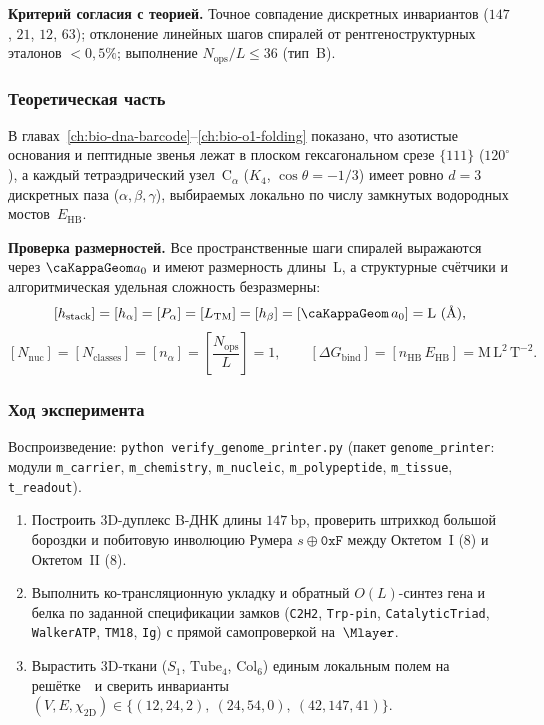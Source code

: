 \textbf{Критерий согласия с теорией.}
Точное совпадение дискретных инвариантов ($147$, $21$, $12$, $63$); отклонение линейных шагов спиралей от рентгеноструктурных эталонов $<0{,}5\%$; выполнение $N_{\mathrm{ops}}/L \le 36$ (тип~B).

\subsubsection*{Теоретическая часть}
В главах~\ref{ch:bio-dna-barcode}--\ref{ch:bio-o1-folding} показано, что азотистые основания и пептидные звенья лежат в плоском гексагональном срезе $\{111\}$ ($120^\circ$), а каждый тетраэдрический узел~$\text{C}_\alpha$ ($K_4$, $\cos\theta=-1/3$) имеет ровно $d=3$ дискретных паза ($\alpha,\beta,\gamma$), выбираемых локально по числу замкнутых водородных мостов~$E_{\mathrm{HB}}$.

\textbf{Проверка размерностей.}
Все пространственные шаги спиралей выражаются через $\caKappaGeom a_0$ и имеют размерность длины~$\mathrm{L}$, а структурные счётчики и алгоритмическая удельная сложность безразмерны:
\[
  [h_{\mathrm{stack}}] = [h_\alpha] = [P_\alpha] = [L_{\mathrm{TM}}] = [h_\beta] = [\caKappaGeom\,a_0] = \mathrm{L}\ (\text{\normalfont\AA}),
\]
\[
  [N_{\mathrm{nuc}}] = [N_{\mathrm{classes}}] = [n_\alpha] = \left[\frac{N_{\mathrm{ops}}}{L}\right] = 1,\qquad
  [\Delta G_{\mathrm{bind}}] = [n_{\mathrm{HB}}\,E_{\mathrm{HB}}] = \mathrm{M\,L^2\,T^{-2}}.
\]

\subsubsection*{Ход эксперимента}
Воспроизведение: \texttt{python verify\_genome\_printer.py} (пакет \texttt{genome\_printer}: модули \texttt{m\_carrier}, \texttt{m\_chemistry}, \texttt{m\_nucleic}, \texttt{m\_polypeptide}, \texttt{m\_tissue}, \texttt{t\_readout}).

\begin{enumerate}[label=\textbf{Шаг \arabic*:},leftmargin=*,itemsep=0.35em]
\item Построить 3D-дуплекс B-ДНК длины $147\ \mathrm{bp}$, проверить штрихкод большой бороздки и побитовую инволюцию Румера $s\oplus\texttt{0xF}$ между Октетом~I ($8$) и Октетом~II ($8$).
\item Выполнить ко-трансляционную укладку и обратный $O(L)$-синтез гена и белка по заданной спецификации замков (\texttt{C2H2}, \texttt{Trp-pin}, \texttt{CatalyticTriad}, \texttt{WalkerATP}, \texttt{TM18}, \texttt{Ig}) с прямой самопроверкой на~$\Mlayer$.
\item Вырастить 3D-ткани ($S_1$, $\mathrm{Tube}_4$, $\mathrm{Col}_6$) единым локальным полем на решётке~\latGCKshort\ и сверить инварианты $(V, E, \chi_{\mathrm{2D}}) \in \{(12,24,2),\ (24,54,0),\ (42,147,41)\}$.
\end{enumerate}

